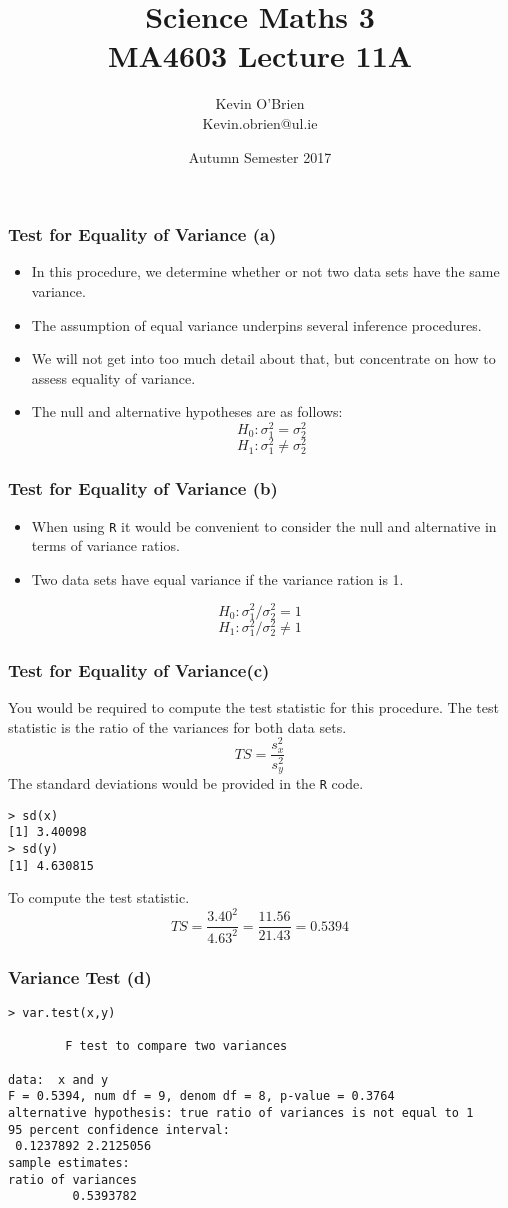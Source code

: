 \documentclass[a4]{beamer}
\title[MA4603]{Science Maths 3 \\ {\normalsize MA4603 Lecture 11A}}
\author[Kevin O'Brien]{Kevin O'Brien \\ {\scriptsize Kevin.obrien@ul.ie}}
\date{Autumn Semester 2017}
\institute[Maths \& Stats]{Dept. of Mathematics \& Statistics, \\ University \textit{of} Limerick}
\begin{document}

\begin{frame}

\frametitle{Test for Equality of Variance (a)}
\begin{itemize}
\item In this procedure, we determine whether or not two data sets have the same variance.
\item The assumption of equal variance underpins several inference procedures.
\item We will not get into too much detail about that, but concentrate on how to assess equality of variance.
\item The null and alternative hypotheses are as follows:
\[ H_0: \sigma^2_1 = \sigma^2_2 \]
\[ H_1: \sigma^2_1 \neq \sigma^2_2 \]
\end{itemize}

\end{frame}
\begin{frame}
\frametitle{Test for Equality of Variance (b)}
\begin{itemize}
\item When using \texttt{R} it would be convenient to consider the null and alternative in terms of variance ratios.
\item Two data sets have equal variance if the variance ration is 1.
\end{itemize}

\[ H_0: \sigma^2_1 / \sigma^2_2 = 1 \]
\[ H_1: \sigma^2_1 / \sigma^2_2 \neq 1 \]
\end{frame}
\begin{frame}[fragile]
\frametitle{Test for Equality of Variance(c)}
You would be required to compute the test statistic for this procedure.
The test statistic is the ratio of the variances for both data sets.
\[ TS = \frac{s^2_x}{s^2_y} \]
The standard deviations would be provided in the \texttt{R} code. \begin{verbatim}
> sd(x)
[1] 3.40098
> sd(y)
[1] 4.630815
\end{verbatim}
To compute the test statistic.
\[ TS = \frac{3.40^2}{4.63^2} = \frac{11.56}{21.43} = 0.5394 \]

\end{frame}
\begin{frame}[fragile]
\frametitle{Variance Test (d)}
\begin{verbatim}
> var.test(x,y)

        F test to compare two variances

data:  x and y
F = 0.5394, num df = 9, denom df = 8, p-value = 0.3764
alternative hypothesis: true ratio of variances is not equal to 1
95 percent confidence interval:
 0.1237892 2.2125056
sample estimates:
ratio of variances
         0.5393782
\end{verbatim}

\end{frame}
\end{document}
